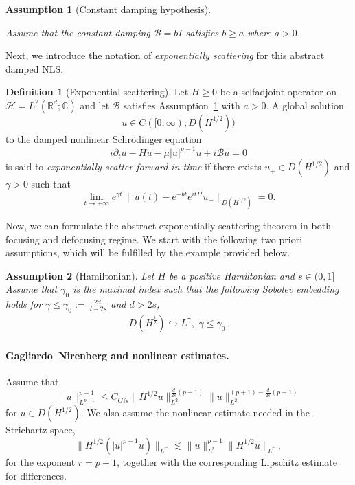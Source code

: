 \documentclass[10pt%
]{amsart}
\numberwithin{equation}{section}
\newtheorem{assumption}{Assumption}[section]
\theoremstyle{definition}
\newtheorem{definition}[theorem]{Definition}
\begin{document}
	
	\begin{assumption}
			[Constant damping hypothesis]\label{ass:damp}
			
			Assume that the constant damping $\mathcal{B}=bI$ satisfies $b\geq a$ where $a>0$.
	\end{assumption}


Next, we introduce the notation of \emph{exponentially scattering} for this abstract damped NLS.
	\begin{definition}[Exponential scattering]\label{def:exp-scatt}
				Let $H\ge0$ be a selfadjoint operator on $\mathcal H=L^2(\mathbb R^d;\mathbb C)$ and let
				$\mathcal B$ satisfies Assumption~\ref{ass:damp} with  $a>0$.
				A global solution
				\[
				u \in C([0,\infty);D(H^{1/2}))
				\]
				to the damped nonlinear Schr\"odinger equation
				\[
				i\partial_t u - Hu - \mu|u|^{p-1}u + i\mathcal Bu = 0
				\]
				is said to \emph{exponentially scatter forward in time} if there exists
				$u_+\in D(H^{1/2})$ and $\gamma>0$ such that
				\[
				\lim_{t\to+\infty}
				e^{\gamma t}\,
				\big\|
				u(t)-e^{-bt}e^{itH}u_+
				\big\|_{D(H^{1/2})}
				=0.
				\]
	\end{definition}


Now, we can formulate the abstract exponentially scattering theorem in both focusing and defocusing regime.  We start with the following two priori assumptions, which will be fulfilled by the example provided below. 
	\begin{assumption}[Hamiltonian]\label{ass:Hamiltonian}
		Let $H$ be a positive Hamiltonian and $s\in(0,1]$ Assume that $\gamma_0$ is the maximal index such that the following Sobolev embedding holds for $\gamma\leq\gamma_0:=\frac{2d}{d-2s}$ and $d>2s$,
		\begin{align*}
			D(H^\frac{1}{2})\hookrightarrow L^\gamma,\,\,\gamma\leq\gamma_0.
		\end{align*}
	\end{assumption}
	\paragraph{Gagliardo--Nirenberg and nonlinear estimates.}
		Assume that
		\begin{equation}\label{eq:GN-abstract}
			\|u\|_{L^{p+1}}^{p+1}
			\le C_{GN}\|H^{1/2}u\|_{L^2}^{\frac{d}{2s}(p-1)}
			\|u\|_{L^2}^{(p+1)-\frac{d}{2s}(p-1)}
		\end{equation}
		for $u\in D(H^{1/2})$. We also assume the nonlinear estimate needed in the Strichartz space,
		\begin{equation}\label{eq:abstract-chain-rule}
			\|H^{1/2}(|u|^{p-1}u)\|_{L^{r'}}
			\lesssim \|u\|_{L^r}^{p-1}\|H^{1/2}u\|_{L^r},
		\end{equation}
		for the exponent $r=p+1$, together with the corresponding Lipschitz estimate for differences.
\end{document}
